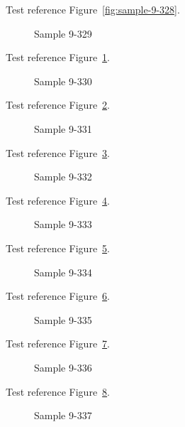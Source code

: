 Test reference Figure~\ref{fig:sample-9-328}.

\begin{figure}[tbhp]
\caption{Sample 9-329}
\label{fig:sample-9-329}
\end{figure}

Test reference Figure~\ref{fig:sample-9-329}.

\begin{figure}[tbhp]
\caption{Sample 9-330}
\label{fig:sample-9-330}
\end{figure}

Test reference Figure~\ref{fig:sample-9-330}.

\begin{figure}[tbhp]
\caption{Sample 9-331}
\label{fig:sample-9-331}
\end{figure}

Test reference Figure~\ref{fig:sample-9-331}.

\begin{figure}[tbhp]
\caption{Sample 9-332}
\label{fig:sample-9-332}
\end{figure}

Test reference Figure~\ref{fig:sample-9-332}.

\begin{figure}[tbhp]
\caption{Sample 9-333}
\label{fig:sample-9-333}
\end{figure}

Test reference Figure~\ref{fig:sample-9-333}.

\begin{figure}[tbhp]
\caption{Sample 9-334}
\label{fig:sample-9-334}
\end{figure}

Test reference Figure~\ref{fig:sample-9-334}.

\begin{figure}[tbhp]
\caption{Sample 9-335}
\label{fig:sample-9-335}
\end{figure}

Test reference Figure~\ref{fig:sample-9-335}.

\begin{figure}[tbhp]
\caption{Sample 9-336}
\label{fig:sample-9-336}
\end{figure}

Test reference Figure~\ref{fig:sample-9-336}.

\begin{figure}[tbhp]
\caption{Sample 9-337}
\label{fig:sample-9-337}
\end{figure}

